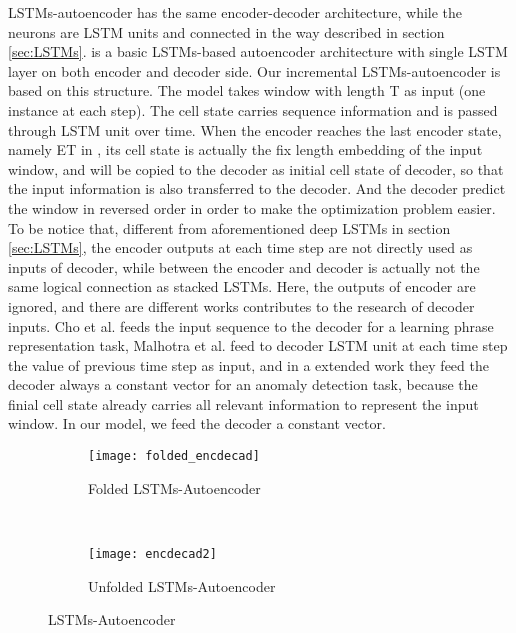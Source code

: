 LSTMs-autoencoder has the same encoder-decoder architecture, while the neurons are LSTM units and connected in the way described in section \ref{sec:LSTMs}.  is a basic LSTMs-based autoencoder architecture with single LSTM layer on both encoder and decoder side. Our incremental LSTMs-autoencoder is based on this structure. The model takes window with length T as input (one instance at each step). The cell state carries sequence information and is passed through LSTM unit over time. When the encoder reaches the last encoder state, namely ET in , its cell state is actually the fix length embedding of the input window, and will be copied to the decoder as initial cell state of decoder, so that the input information is also transferred to the decoder. And the decoder predict the window in reversed order in order to make the optimization problem easier. To be notice that, different from aforementioned deep LSTMs in section \ref{sec:LSTMs}, the encoder outputs at each time step are not directly used as inputs of decoder, while between the encoder and decoder is actually not the same logical connection as stacked LSTMs. Here, the outputs of encoder are ignored, and there are different works contributes to the research of decoder inputs. Cho et al. \cite{phraserepresentation} feeds the input sequence to the decoder for a learning phrase representation task, Malhotra et al. \cite{encdecad} feed to decoder LSTM unit at each time step the value of previous time step as input, and in a extended work \cite{timenet} they feed the decoder always a constant vector for an anomaly detection task, because the finial cell state already carries all relevant information to represent the input window. In our model, we feed the decoder a constant vector.\\

\begin{figure}[t!]
\centering
	\begin {subfigure}[t]{0.45\textwidth}
	\centering
	\texttt{[image: folded\_encdecad]}
	\caption{Folded LSTMs-Autoencoder}
	\label{fig:encdecad1}
	\end{subfigure}
	~
	\begin {subfigure}[t]{0.45\textwidth}
	\centering
	\texttt{[image: encdecad2]}
	\caption{Unfolded LSTMs-Autoencoder}
	\label{fig:encdecad2}
	\end{subfigure}
	\caption[LSTMs-Autoencoder]{LSTMs-Autoencoder}
\label{fig:encdecad}

\end{figure}






